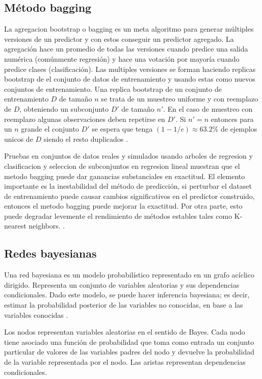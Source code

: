 \subsection{Método bagging}
La agregacion bootstrap o bagging es un meta algoritmo para generar múltiples versiones de un predictor y con estos conseguir un predictor agregado. La agregación hace un promedio de todas las versiones cuando predice una salida numérica (comúnmente regresión) y hace una votación por mayoría cuando predice clases (clasificación).
Las multiples versiones se forman haciendo replicas bootstrap de el conjunto de datos de entrenamiento y usando estas como nuevos conjuntos de entrenamiento.
Una replica bootstrap de un conjunto de entrenamiento $D$ de tamaño $n$ se trata de un muestreo uniforme y con reemplazo de $D$, obteniendo un subconjunto $D'$ de tamaño $n'$. En el caso de muestreo con reemplazo algunas observaciones deben repetirse en $D'$. Si $n'=n$ entonces para un $n$ grande el conjunto $D'$ se espera que tenga $(1-1/e) \approx 63.2\%$ de ejemplos unicos de $D$ siendo el resto duplicados \cite{EstimatingtheSizeandConfidenceofaStatisticalAudit}.

Pruebas en conjuntos de datos reales y simulados usando arboles de regresion y clasificacion y seleccion de subconjuntos en regresion lineal muestran que el metodo bagging puede dar ganancias substanciales en exactitud.
El elemento importante es la inestabilidad del método de predicción, si perturbar el dataset de entrenamiento puede causar cambios significativos en el predictor construido, entonces el metodo bagging puede mejorar la exactitud. Por otra parte, esto puede degradar levemente el rendimiento de métodos estables tales como K-nearest neighbors.
\cite{BreimanLMachineLearning1996}.

\subsection{Redes bayesianas}
Una red bayesiana es un modelo probabilístico representado en un grafo acíclico dirigido. Representa un conjunto de variables aleatorias y sus dependencias condicionales. Dado este modelo, se puede hacer inferencia bayesiana; es decir, estimar la probabilidad posterior de las variables no conocidas, en base a las variables conocidas \cite{LESucarChapter1RedesBayesianas}. 

Los nodos representan variables aleatorias en el sentido de Bayes. Cada nodo tiene asociado una función de probabilidad que toma como entrada un conjunto particular de valores de las variables padres del nodo y devuelve la probabilidad de la variable representada por el nodo. Las aristas representan dependencias condicionales.

